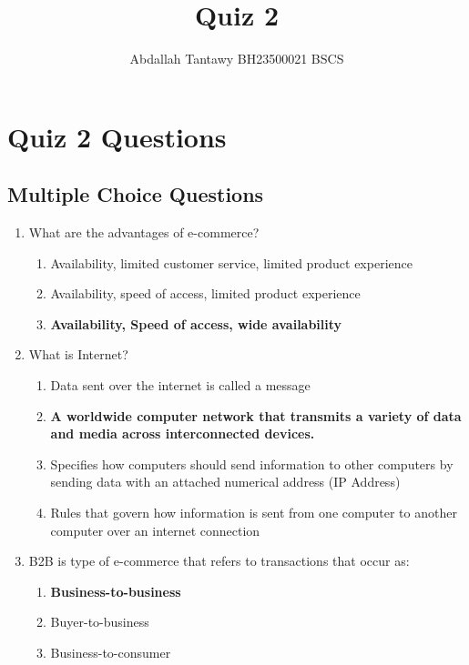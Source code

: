\documentclass{article}
\title{Quiz 2}
\author{Abdallah Tantawy \quad BH23500021 \quad BSCS}
\begin{document}
\maketitle


\section*{Quiz 2 Questions}

\subsection*{Multiple Choice Questions}

\begin{enumerate}[label=\arabic*.]
    \item What are the advantages of e-commerce?
          \begin{enumerate}
              \item Availability, limited customer service, limited product experience
              \item Availability, speed of access, limited product experience
              \item \textbf{Availability, Speed of access, wide availability}
          \end{enumerate}
    \item What is Internet?
        \begin{enumerate}
            \item Data sent over the internet is called a message
            \item \textbf{A worldwide computer network that transmits a variety of data and media across interconnected devices.}
            \item Specifies how computers should send information to other computers by sending data with an attached numerical address (IP Address)
            \item Rules that govern how information is sent from one computer to another computer over an internet connection
        \end{enumerate}
    \item B2B is type of e-commerce that refers to transactions that occur as:
        \begin{enumerate}
            \item \textbf{Business-to-business}
            \item Buyer-to-business
            \item Business-to-consumer

\end{enumerate}
\end{enumerate}
\end{document}
